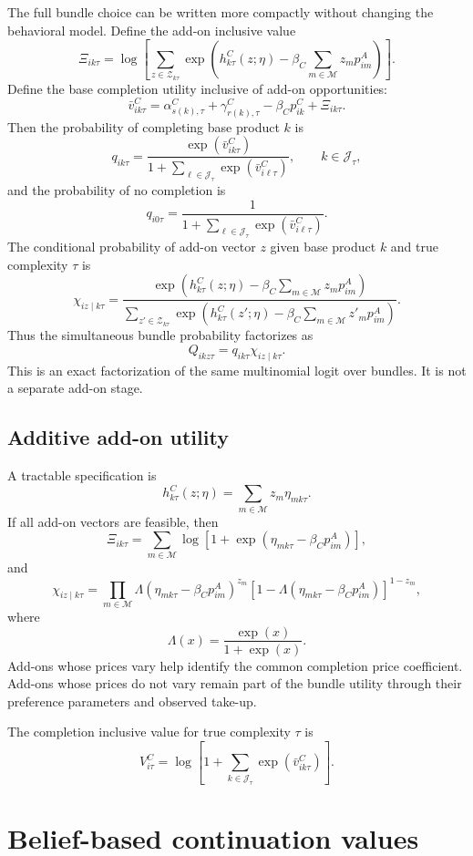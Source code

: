\documentclass[11pt]{article}
\newcommand{\J}{\mathcal{J}}
\newcommand{\Zset}{\mathcal{Z}}
\newcommand{\Mset}{\mathcal{M}}
\begin{document}
The full bundle choice can be written more compactly without changing the behavioral model. Define the add-on inclusive value
\[
\Xi_{ik\tau}
=
\log\left[
\sum_{z\in\Zset_{k\tau}}
\exp\left(
 h^C_{k\tau}(z;\eta)
 -\beta_C\sum_{m\in\Mset}z_m p_{im}^A
\right)
\right].
\]
Define the base completion utility inclusive of add-on opportunities:
\[
\bar v^C_{ik\tau}
=
\alpha^C_{s(k),\tau}
+
\gamma^C_{r(k),\tau}
-
\beta_C p_{ik}^C
+
\Xi_{ik\tau}.
\]
Then the probability of completing base product $k$ is
\[
q_{ik\tau}
=
\frac{\exp(\bar v^C_{ik\tau})}
{1+\sum_{\ell\in\J_\tau}\exp(\bar v^C_{i\ell\tau})},
\qquad k\in\J_\tau,
\]
and the probability of no completion is
\[
q_{i0\tau}
=
\frac{1}{1+\sum_{\ell\in\J_\tau}\exp(\bar v^C_{i\ell\tau})}.
\]
The conditional probability of add-on vector $z$ given base product $k$ and true complexity $\tau$ is
\[
\chi_{iz\mid k\tau}
=
\frac{\exp\left(
 h^C_{k\tau}(z;\eta)
 -\beta_C\sum_{m\in\Mset}z_m p_{im}^A
\right)}
{\sum_{z'\in\Zset_{k\tau}}\exp\left(
 h^C_{k\tau}(z';\eta)
 -\beta_C\sum_{m\in\Mset}z'_m p_{im}^A
\right)}.
\]
Thus the simultaneous bundle probability factorizes as
\[
Q_{ikz\tau}=q_{ik\tau}\chi_{iz\mid k\tau}.
\]
This is an exact factorization of the same multinomial logit over bundles. It is not a separate add-on stage.

\subsection*{Additive add-on utility}

A tractable specification is
\[
h^C_{k\tau}(z;\eta)=\sum_{m\in\Mset} z_m\eta_{mk\tau}.
\]
If all add-on vectors are feasible, then
\[
\Xi_{ik\tau}
=
\sum_{m\in\Mset}
\log\left[1+\exp(\eta_{mk\tau}-\beta_C p_{im}^A)\right],
\]
and
\[
\chi_{iz\mid k\tau}
=
\prod_{m\in\Mset}
\Lambda(\eta_{mk\tau}-\beta_C p_{im}^A)^{z_m}
\left[1-\Lambda(\eta_{mk\tau}-\beta_C p_{im}^A)\right]^{1-z_m},
\]
where
\[
\Lambda(x)=\frac{\exp(x)}{1+\exp(x)}.
\]
Add-ons whose prices vary help identify the common completion price coefficient. Add-ons whose prices do not vary remain part of the bundle utility through their preference parameters and observed take-up.

The completion inclusive value for true complexity $\tau$ is
\[
V^C_{i\tau}
=
\log\left[1+\sum_{k\in\J_\tau}\exp(\bar v^C_{ik\tau})\right].
\]

\section{Belief-based continuation values}
\end{document}
